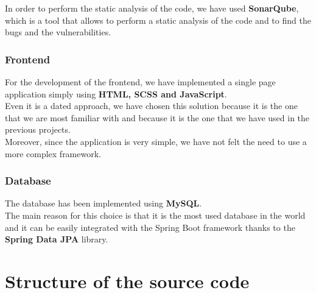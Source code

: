 In order to perform the static analysis of the code, we have used \textbf{SonarQube}, which is a tool that allows to perform a static analysis of the code and to find the bugs and the vulnerabilities.

\subsubsection{Frontend}
For the development of the frontend, we have implemented a single page application simply using \textbf{HTML, SCSS and JavaScript}.\\Even it is a dated approach, we have chosen this solution because it is the one that we are most familiar with and because it is the one that we have used in the previous projects.\\Moreover, since the application is very simple, we have not felt the need to use a more complex framework.

\subsubsection{Database}
The database has been implemented using \textbf{MySQL}.\\
The main reason for this choice is that it is the most used database in the world and it can be easily integrated with the Spring Boot framework thanks to the \textbf{Spring Data JPA} library.

\section{Structure of the source code}


